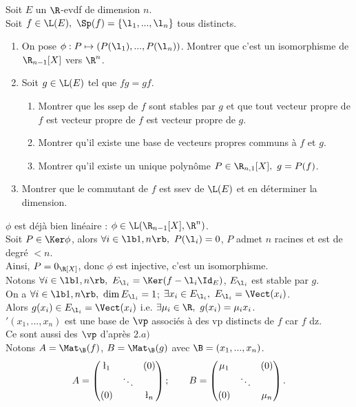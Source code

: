 \documentclass[11pt]{article}
\begin{document}
\begin{exercice}{}{}
    Soit $E$ un $\R$-evdf de dimension $n$.\\
    Soit $f\in\L(E), ~ \Sp(f)=\{\l_1,...,\l_n\}$ tous distincts.
    \begin{enumerate}
        \item On pose $\phi:P\mapsto (P(\l_1),...,P(\l_n))$. Montrer que c'est un isomorphisme de $\R_{n-1}[X]$ vers $\R^n$.
        \item Soit $g\in\L(E)$ tel que $fg=gf$.
        \begin{enumerate}
            \item Montrer que les ssep de $f$ sont stables par $g$ et que tout vecteur propre de $f$ est vecteur propre de $f$ est vecteur propre de $g$.
            \item Montrer qu'il existe une base de vecteurs propres communs à $f$ et $g$.
            \item Montrer qu'il existe un unique polynôme $P\in\R_{n,1}[X], ~ g=P(f)$.
        \end{enumerate}
        \item Montrer que le commutant de $f$ est ssev de $\L(E)$ et en déterminer la dimension.
    \end{enumerate}
    \tcblower
     $\phi$ est déjà bien linéaire : $\phi\in\L(\R_{n-1}[X],\R^n)$.\\
    Soit $P\in\Ker\phi$, alors $\forall i \in \lb1,n\rb, ~ P(\l_i)=0$, $P$ admet $n$ racines et est de degré $<n$.\\
    Ainsi, $P=0_{\R[X]}$, donc $\phi$ est injective, c'est un isomorphisme.\\
     Notons $\forall i \in \lb1,n\rb, ~ E_{\l_i}=\Ker(f-\l_i\Id_E)$, $E_{\l_i}$ est stable par $g$.\\
    On a $\forall i \in \lb1,n\rb, ~ \dim E_{\l_i}=1$; $\exists x_i \in E_{\l_i}, ~ E_{\l_i}=\Vect(x_i)$.\\
    Alors $g(x_i)\in E_{\l_i}=\Vect(x_i)$ i.e. $\exists \mu_i \in \R, ~ g(x_i)=\mu_ix_i$.\\
     $'(x_1,...,x_n)$ est une base de $\vp$ associés à des vp distincts de $f$ car $f$ dz.\\
    Ce sont aussi des $\vp$ d'après $2.a)$\\
     Notons $A=\Mat_\B(f)$, $B=\Mat_\B(g)$ avec $\B=(x_1,...,x_n)$.
    \begin{equation*}
        A= \begin{pmatrix}\l_1 & & (0) \\ & \ddots & \\ (0) & & \l_n\end{pmatrix}; \qquad B = \begin{pmatrix}\mu_1 & & (0) \\ & \ddots & \\ (0) &  & \mu_n\end{pmatrix}.

\end{equation*}
\end{exercice}
\end{document}
